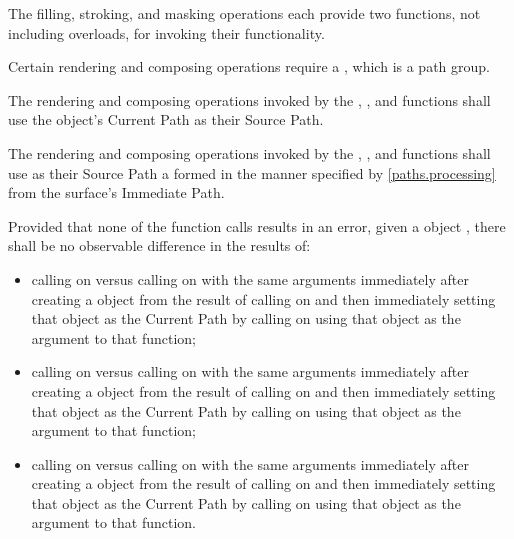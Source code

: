 \pnum
The filling, stroking, and masking operations each provide two functions, not including overloads, for invoking their functionality.

\pnum
Certain rendering and composing operations require a , which is a path group.

\pnum
The rendering and composing operations invoked by the , , and  functions shall use the  object's Current Path as their Source Path.

\pnum
The rendering and composing operations invoked by the , , and  functions shall use as their Source Path a  formed in the manner specified by \ref{paths.processing} from the surface's Immediate Path.

\pnum
Provided that none of the function calls results in an error, given a  object , there shall be no observable difference in the results of:
\begin{itemize}
	\item calling  on  versus calling  on  with the same arguments immediately after creating a  object from the result of calling  on  and then immediately setting that  object as the Current Path by calling  on  using that  object as the argument to that function;
	
	\item calling  on  versus calling  on  with the same arguments immediately after creating a  object from the result of calling  on  and then immediately setting that  object as the Current Path by calling  on  using that  object as the argument to that function;
	
	\item calling  on  versus calling  on  with the same arguments immediately after creating a  object from the result of calling  on  and then immediately setting that  object as the Current Path by calling  on  using that  object as the argument to that function.
\end{itemize}

